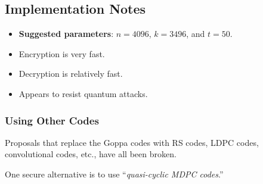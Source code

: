 \subsection*{Implementation Notes}
\begin{itemize}
    \item \textbf{Suggested parameters}: $ n=4096 $, $ k=3496 $, and $ t=50 $.
    \item Encryption is very fast.
    \item Decryption is relatively fast.
    \item Appears to resist quantum attacks.
\end{itemize}
\subsubsection*{Using Other Codes}
Proposals that replace the Goppa codes with RS codes, LDPC codes,
convolutional codes, etc., have all been broken.

One secure alternative is to use ``\emph{quasi-cyclic MDPC codes}.''
